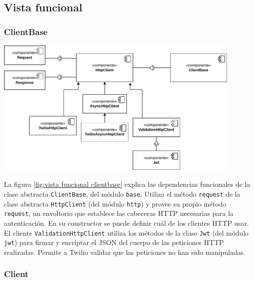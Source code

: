 \documentclass{article}
\begin{document}
\newpage

\subsection{Vista funcional}

\subsubsection{ClientBase}

\hfill

\begin{center}
  \includegraphics[width=0.9\textwidth]{VistaFuncionalClienteBase.pdf}
  \label{fig:vista funcional clientbase}
\end{center}

\hfill

La figura \ref{fig:vista funcional clientbase}
explica las dependencias funcionales de
la clase abstracta \verb|ClientBase|,
del módulo \verb|base|.
Utiliza el método \verb|request|
de la clase abstracta \verb|HttpClient|
(del módulo \verb|http|)
y provee su propio método \verb|request|,
un envoltorio que establece las cabeceras HTTP necesarias para la autenticación.
En su constructor se puede definir cuál de los clientes HTTP usar.
El cliente \verb|ValidationHttpClient|
utiliza los métodos de la clase \verb|Jwt|
(del módulo \verb|jwt|)
para firmar y encriptar el JSON del cuerpo
de las peticiones HTTP realizadas. Permite a Twilio validar que las peticiones no han sido manipuladas.

\subsubsection{Client}

\hfill
\end{document}
